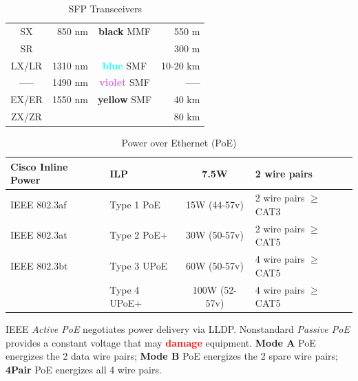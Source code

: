 \documentclass[12pt]{article}
\newcommand{\textcolorbf}[2]{\textcolor{#1} {\textbf{#2}}}
\begin{document}
	\begin{table}[H]
	\centering
	\caption{SFP Transceivers \label{tab:SFP}}
	\begin{tabular}{| c | r | c | r |}
	\hline
	SX		& 850 nm		& \textbf{black} MMF				& 550 m\\
	SR		&			&							& 300 m\\\hline
	LX/LR		& 1310 nm		& \textcolorbf{Cyan}{blue} SMF		& 10-20 km\\\hline
	----- 		& 1490 nm		& \textcolorbf{Orchid}{violet} SMF 		& -----\\\hline
	EX/ER 	& 1550 nm		& \textcolorbf{Dandelion}{yellow} SMF 	& 40 km\\
	ZX/ZR	&			&							& 80 km\\\hline
	\end{tabular}\end{table}

	\begin{table}[H]
	\centering
	\caption{Power over Ethernet (PoE) \label{tab:POE}}
	\begin{tabular}{| l  l | c | l |}
	\hline
	Cisco Inline Power	& ILP			& 7.5W			& 2 wire pairs\\\hline
	IEEE 802.3af			& Type 1 PoE	& 15W (44-57v)		& 2 wire pairs $\ge$ CAT3\\\hline
	IEEE 802.3at			& Type 2 PoE+	& 30W (50-57v)		& 2 wire pairs $\ge$ CAT5\\\hline
	IEEE 802.3bt 		& Type 3 UPoE	& 60W (50-57v) 		& 4 wire pairs $\ge$ CAT5\\
					& Type 4 UPoE+	& 100W (52-57v)		& 4 wire pairs $\ge$ CAT5\\\hline
	\end{tabular}\end{table}
	IEEE \textit{Active PoE} negotiates power delivery via LLDP. Nonstandard \textit{Passive PoE} provides a constant voltage that may \textcolorbf{Red}{damage} equipment. \textbf{Mode A} PoE energizes the 2 data wire pairs; \textbf{Mode B} PoE energizes the 2 spare wire pairs; \textbf{4Pair} PoE energizes all 4 wire pairs.





\end{document}
